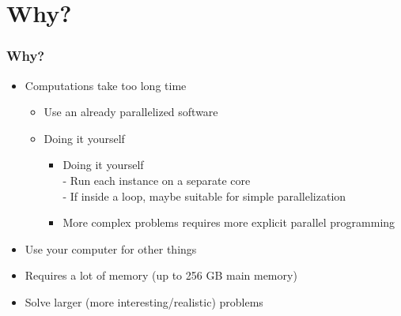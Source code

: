 %

\section{Why?}



\begin{frame}
	\frametitle{Why?}
  
	\begin{itemize}
		\item	Computations take too long time
			\begin{itemize}
				\item	Use an already parallelized software
				\item	Doing it yourself
					\begin{itemize}
						\item	Doing it yourself\\
								- Run each instance on a separate core\\
								- If inside a loop, maybe suitable for
										simple parallelization
						\item	More complex problems requires more explicit
								parallel programming
					\end{itemize}
			\end{itemize}
		\item	Use your computer for other things
		\item	Requires a lot of memory (up to 256 GB main memory)
		\item	Solve larger (more interesting/realistic) problems
	\end{itemize}

\end{frame}

